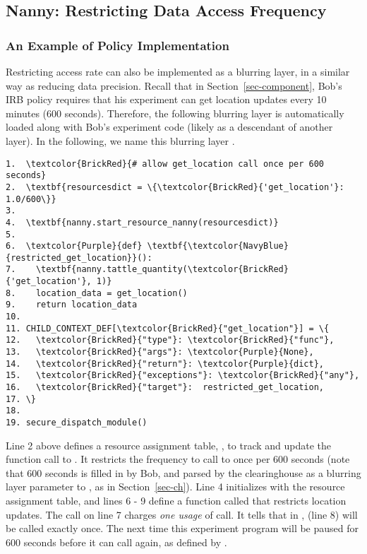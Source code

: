 \subsection{Nanny: Restricting Data Access Frequency}\label{sec-nanny}


\subsubsection{An Example of Policy Implementation}\label{sec-rate-example}

Restricting access rate can also be implemented as a 
blurring layer, in a similar way as reducing data precision.
Recall that in Section~\ref{sec-component}, Bob's IRB policy requires that
his experiment can get location updates every 10 minutes (600 seconds). 
Therefore, the following blurring layer is automatically loaded along with 
Bob's experiment code (likely as a descendant of another layer). In 
the following, we name this blurring layer .

\begin{Verbatim}
1.  \textcolor{BrickRed}{# allow get_location call once per 600 seconds}
2.  \textbf{resourcesdict = \{\textcolor{BrickRed}{'get_location'}: 1.0/600\}} 
3.
4.  \textbf{nanny.start_resource_nanny(resourcesdict)}
5.
6.  \textcolor{Purple}{def} \textbf{\textcolor{NavyBlue}{restricted_get_location}}():
7.    \textbf{nanny.tattle_quantity(\textcolor{BrickRed}{'get_location'}, 1)}
8.    location_data = get_location()
9.    return location_data
10.
11. CHILD_CONTEXT_DEF[\textcolor{BrickRed}{"get_location"}] = \{
12.   \textcolor{BrickRed}{"type"}: \textcolor{BrickRed}{"func"},
13.   \textcolor{BrickRed}{"args"}: \textcolor{Purple}{None},
14.   \textcolor{BrickRed}{"return"}: \textcolor{Purple}{dict},
15.   \textcolor{BrickRed}{"exceptions"}: \textcolor{BrickRed}{"any"},
16.   \textcolor{BrickRed}{"target"}:  restricted_get_location,
17. \}
18. 
19. secure_dispatch_module()
\end{Verbatim}

Line 2 above defines a resource assignment table, , to track and update 
the function call to . It restricts the frequency to 
call  to once per 600 seconds (note that 
600 seconds is filled in by Bob, and parsed by the clearinghouse as a blurring layer 
parameter to , as in Section~\ref{sec-ch}). Line 4 initializes  
with the resource assignment table, and lines 6 - 9 define a 
function called  that restricts location updates. 
The  call on line 7 charges \textit{one usage} of  
call. It tells  that in , 
 (line 8) will be called exactly once. The
next time this experiment program 
will be paused for 600 seconds before it can call  again,
as defined by .

